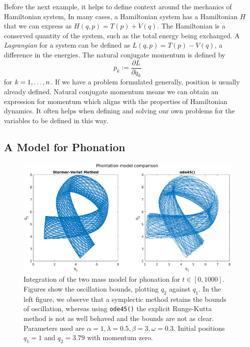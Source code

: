 Before the next example, it helps to define context around the mechanics of Hamiltonian system,
In many cases, a Hamiltonian system has a Hamiltonian $H$ that we can express as $H(q,p) = T(p) + V(q)$.
The Hamiltonian is a conserved quantity of the system, such as the total energy being exchanged.
A \textit{Lagrangian} for a system can be defined as $L(q,p) = T(p) - V(q)$,
a difference in the energies.
The natural conjugate momentum is defined by
\begin{equation}
	p_k := \dfrac{\partial L}{\partial \dot{q}_k}
\end{equation}
for $k = 1,\mathellipsis,n$.
If we have a problem formulated generally, position is usually already defined.
Natural conjugate momentum means we can obtain an expression for momentum which aligns with the properties of Hamiltonian dynamics.
It often helps when defining and solving our own problems for the variables to be defined in this way.

\subsection{A Model for Phonation}


\begin{figure}
	\centering
	\includegraphics[width = \linewidth]{figures/phonationcomp.eps}
	\caption{
		Integration of the two mass model for phonation for $t \in [0, 1000]$.
		Figures show the oscillation bounds, plotting $q_2$ against $q_1$.
		In the left figure, we observe that a symplectic method retains the bounds of oscillation,
		whereas using \texttt{ode45()} the explicit Runge-Kutta method is not as well behaved and the bounds are not as clear.
		Parameters used are $\alpha = 1, \lambda = 0.5, \beta = 3, \omega = 0.3$.
		Initial positions $q_1 = 1$ and $q_2 = 3.79$ with momentum zero.
	}
	\label{fig:phon}
\end{figure}

